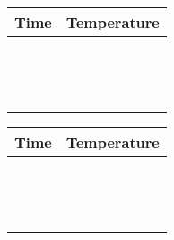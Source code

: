 \documentclass[12pt,a4paper]{article}
\begin{document}
\begin{multicols}{2}
\begin{center}
\begin{tabular}{c|c}
Time & Temperature \\\hline\hline
\phantom{222222222} & \phantom{222222222} \\\hline
\phantom{222222222} & \phantom{222222222} \\\hline
\phantom{222222222} & \phantom{222222222} \\\hline
\phantom{222222222} & \phantom{222222222} \\\hline
\phantom{222222222} & \phantom{222222222} \\\hline
\phantom{222222222} & \phantom{222222222} \\\hline
\phantom{222222222} & \phantom{222222222} \\\hline
\phantom{222222222} & \phantom{222222222} \\\hline
\phantom{222222222} & \phantom{222222222} \\\hline
\phantom{222222222} & \phantom{222222222} \\\hline
\phantom{222222222} & \phantom{222222222} \\\hline
\phantom{222222222} & \phantom{222222222} \\\hline
\phantom{222222222} & \phantom{222222222} \\\hline
\phantom{222222222} & \phantom{222222222} \\
\end{tabular}
\end{center}

\begin{center}
\begin{tabular}{c|c}
Time & Temperature \\\hline\hline
\phantom{222222222} & \phantom{222222222} \\\hline
\phantom{222222222} & \phantom{222222222} \\\hline
\phantom{222222222} & \phantom{222222222} \\\hline
\phantom{222222222} & \phantom{222222222} \\\hline
\phantom{222222222} & \phantom{222222222} \\\hline
\phantom{222222222} & \phantom{222222222} \\\hline
\phantom{222222222} & \phantom{222222222} \\\hline
\phantom{222222222} & \phantom{222222222} \\\hline
\phantom{222222222} & \phantom{222222222} \\\hline
\phantom{222222222} & \phantom{222222222} \\\hline
\phantom{222222222} & \phantom{222222222} \\\hline
\phantom{222222222} & \phantom{222222222} \\\hline
\phantom{222222222} & \phantom{222222222} \\\hline
\phantom{222222222} & \phantom{222222222} \\
\end{tabular}
\end{center}
\end{multicols}
\end{document}
